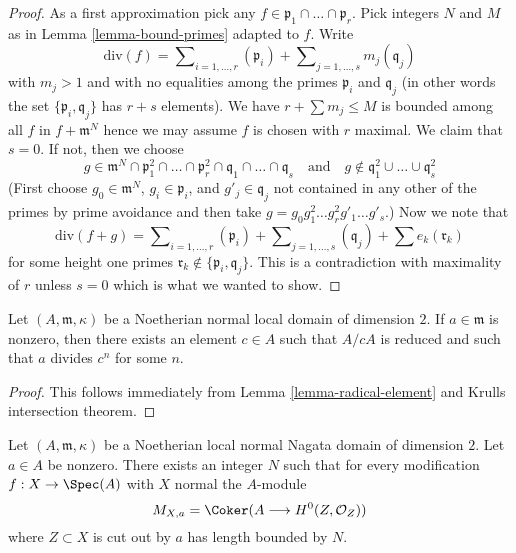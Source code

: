 \begin{proof}
As a first approximation pick any
$f \in \mathfrak p_1 \cap \ldots \cap \mathfrak p_r$.
Pick integers $N$ and $M$ as in Lemma \ref{lemma-bound-primes}
adapted to $f$. Write
$$
\text{div}(f) =
\sum\nolimits_{i = 1, \ldots, r} (\mathfrak p_i) +
\sum\nolimits_{j = 1, \ldots, s} m_j (\mathfrak q_j)
$$
with $m_j > 1$ and with no equalities among the primes
$\mathfrak p_i$ and $\mathfrak q_j$ (in other words the set
$\{\mathfrak p_i, \mathfrak q_j\}$ has $r + s$ elements).
We have $r + \sum m_j \leq M$ is bounded among all $f$ in
$f + \mathfrak m^N$ hence we may assume $f$ is chosen with $r$
maximal. We claim that $s = 0$. If not, then we choose
$$
g \in
\mathfrak m^N \cap
\mathfrak p_1^2 \cap \ldots \cap \mathfrak p_r^2 \cap
\mathfrak q_1 \cap \ldots \cap \mathfrak q_s
\quad\text{and}\quad
g \not \in \mathfrak q_1^2 \cup \ldots \cup \mathfrak q_s^2
$$
(First choose $g_0 \in \mathfrak m^N$,
$g_i \in \mathfrak p_i$, and $g'_j \in \mathfrak q_j$
not contained in any other of the primes by prime avoidance
and then take $g = g_0 g_1^2 \ldots g_r^2 g'_1 \ldots g'_s$.)
Now we note that
$$
\text{div}(f + g) = \sum\nolimits_{i = 1, \ldots, r} (\mathfrak p_i) +
\sum\nolimits_{j = 1, \ldots, s} (\mathfrak q_j) +
\sum e_k (\mathfrak r_k)
$$
for some height one primes
$\mathfrak r_k \not \in \{\mathfrak p_i, \mathfrak q_j\}$.
This is a contradiction with maximality of $r$ unless $s = 0$
which is what we wanted to show.
\end{proof}

\begin{lemma}
\label{lemma-divides-radical}
Let $(A, \mathfrak m, \kappa)$ be a Noetherian normal local domain
of dimension $2$. If $a \in \mathfrak m$ is nonzero, then there exists an
element $c \in A$ such that $A/cA$ is reduced and such that $a$ divides
$c^n$ for some $n$.
\end{lemma}

\begin{proof}
This follows immediately from Lemma \ref{lemma-radical-element}
and Krulls intersection theorem.
\end{proof}

\begin{lemma}
\label{lemma-bound-a-torsion}
Let $(A, \mathfrak m, \kappa)$ be a Noetherian local normal Nagata domain
of dimension $2$. Let $a \in A$ be nonzero. There exists an integer $N$ such
that for every modification $f : X \to \Spec(A)$ with $X$ normal the
$A$-module
$$
M_{X, a} = \Coker(A \longrightarrow H^0(Z, \mathcal{O}_Z))
$$
where $Z \subset X$ is cut out by $a$ has length bounded by $N$.
\end{lemma}

